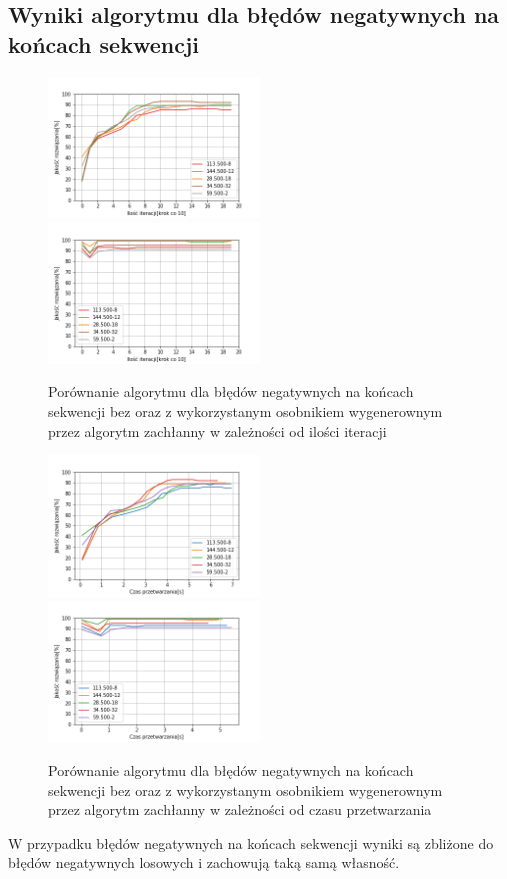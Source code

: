 \documentclass{article}
\begin{document}
\subsection{Wyniki algorytmu dla błędów negatywnych na końcach sekwencji}
\begin{figure}[H]
\includegraphics[width=0.5\textwidth]{neg-pow1.png}
\includegraphics[width=0.5\textwidth]{neg-pow-greedy1.png}
\caption{Porównanie algorytmu dla błędów negatywnych na końcach sekwencji bez oraz z wykorzystanym osobnikiem wygenerownym przez algorytm zachłanny w zależności od ilości iteracji}
\end{figure}
\begin{figure}[H]
\includegraphics[width=0.5\textwidth]{Czasneg-pow1.png}
\includegraphics[width=0.5\textwidth]{Czasneg-pow-greedy1.png}
\caption{Porównanie algorytmu dla błędów negatywnych na końcach sekwencji bez oraz z wykorzystanym osobnikiem wygenerownym przez algorytm zachłanny w zależności od czasu przetwarzania}
\end{figure}
W przypadku  błędów negatywnych na końcach sekwencji wyniki są zbliżone do błędów negatywnych losowych i zachowują taką samą własność.
\end{document}
